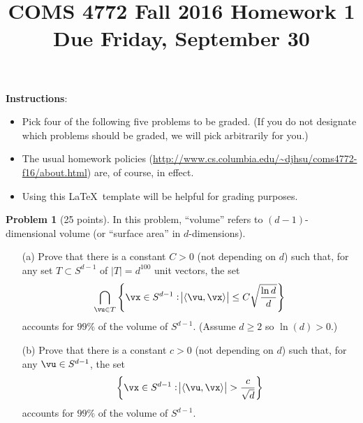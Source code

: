 \documentclass[11pt]{article}
\title{COMS 4772 Fall 2016 Homework 1 \\ Due Friday, September 30}
\author{%
  }
\date{%
  }
\newcommand\ip[1]{\langle #1 \rangle} %
\newcommand{\unitsphere}[1][d-1]{\ensuremath{S^{#1}}} %
\theoremstyle{definition}
\newtheorem{problem}{Problem}
\begin{document}
\maketitle

\noindent\textbf{Instructions}:
\begin{itemize}
  \item
    Pick four of the following five problems to be graded.
    (If you do not designate which problems should be graded, we will pick arbitrarily for you.)

  \item
    The usual homework policies (\url{http://www.cs.columbia.edu/~djhsu/coms4772-f16/about.html}) are, of course, in effect.

  \item
    Using this \LaTeX\ template will be helpful for grading purposes.

\end{itemize}

\newpage


\begin{problem}[25 points]
  In this problem, ``volume'' refers to $(d-1)$-dimensional volume (or ``surface area'' in $d$-dimensions).
  \begin{enumerate}
    \item[(a)]
      Prove that there is a constant $C>0$ (not depending on $d$) such that, for any set $T \subset \unitsphere$ of $|T|=d^{100}$ unit vectors, the set
      \begin{equation*}
        \bigcap_{\vu \in T}
        \cbr{
          \vx \in \unitsphere : \abs{\ip{\vu,\vx}} \leq C\sqrt{\frac{\ln d}{d}}
        }
      \end{equation*}
      accounts for $99\%$ of the volume of $\unitsphere$.
      (Assume $d\geq2$ so $\ln(d) > 0$.)

    \item[(b)]
      Prove that there is a constant $c>0$ (not depending on $d$) such that, for any $\vu \in \unitsphere$, the set
      \begin{equation*}
        \cbr{
          \vx \in \unitsphere : \abs{\ip{\vu,\vx}} > \frac{c}{\sqrt{d}}
        }
      \end{equation*}
      accounts for $99\%$ of the volume of $\unitsphere$.

  \end{enumerate}
\end{problem}
\end{document}
